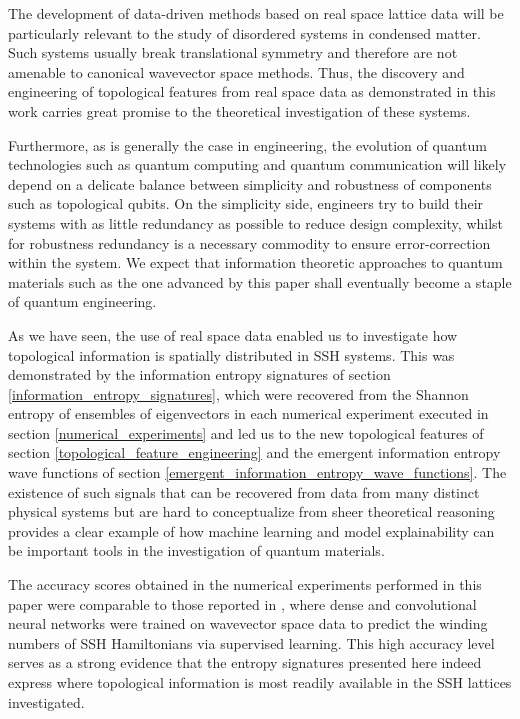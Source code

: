 \documentclass[10pt]{revtex4-1}
\begin{document}
The development of data-driven methods based on real space lattice data will be particularly relevant to the study of disordered systems in condensed matter. Such systems usually break translational symmetry and therefore are not amenable to canonical wavevector space methods. Thus, the discovery and engineering of topological features from real space data as demonstrated in this work carries great promise to the theoretical investigation of these systems.

Furthermore, as is generally the case in engineering, the evolution of quantum technologies such as quantum computing and quantum communication  will likely depend on a delicate balance between simplicity and robustness of components such as topological qubits. On the simplicity side, engineers try to build their systems with as little redundancy as possible to reduce design complexity, whilst for robustness redundancy is a necessary commodity to ensure error-correction within the system. We expect that information theoretic approaches to quantum materials such as the one advanced by this paper shall eventually become a staple of quantum engineering.  

As we have seen, the use of real space data enabled us to investigate how topological information is spatially distributed in SSH systems. This was demonstrated by the information entropy signatures of section \ref{information_entropy_signatures}, which were recovered from the Shannon entropy of ensembles of eigenvectors in each numerical experiment executed in section \ref{numerical_experiments} and led us to the new topological features of section \ref{topological_feature_engineering} and the emergent information entropy wave functions of section \ref{emergent_information_entropy_wave_functions}. The existence of such signals that can be recovered from data from many distinct physical systems but are hard to conceptualize from sheer theoretical reasoning provides a clear example of how machine learning and model explainability can be important tools in the investigation of quantum materials.

The accuracy scores obtained in the numerical experiments performed in this paper were comparable to those reported in \cite{PhysRevLett.120.066401}, where dense and convolutional neural networks were trained on wavevector space data to predict the winding numbers of SSH Hamiltonians via supervised learning. This high accuracy level serves as a strong evidence that the entropy signatures presented here indeed express where topological information is most readily available in the SSH lattices investigated.
\end{document}
